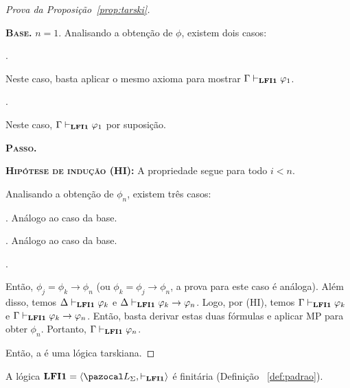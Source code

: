 \begin{proof}[Prova da Proposição~\ref{prop:tarski}]
\begin{adjustwidth}{1cm}{}
\begin{adjustwidth}{1cm}{}
                \textbf{\textsc{Base.}} $n = 1$.
                Analisando a obtenção de $\phi$, existem dois casos:
                \begin{provaporcasos}
                . 
                
                Neste caso, basta aplicar o mesmo axioma para mostrar $\Gamma \vdash_{{\normalfont\textbf{LFI1}}{}} \varphi_1$.
                
                \casodeprova{$\phi_1 \in \Delta$}. 
                
                Neste caso, $\Gamma \vdash_{{\normalfont\textbf{LFI1}}{}} \varphi_1$ por suposição.
            \end{provaporcasos}

            \noindent\textbf{\textsc{Passo.}} 
            
            \noindent \textbf{\textsc{Hipótese de indução (HI):}} A propriedade segue para todo $i < n$.

            Analisando a obtenção de $\phi_n$, existem três casos:
            \begin{provaporcasos}
                . Análogo ao caso da base.
                
                . Análogo ao caso da base.
                
                .
                
                Então, $\phi_j = \phi_k \to \phi_n$ (ou $\phi_k = \phi_j \to \phi_n$, a prova para este caso é análoga). Além disso, temos $\Delta \vdash_{{\normalfont\textbf{LFI1}}{}} \varphi_k$ e $\Delta \vdash_{{\normalfont\textbf{LFI1}}{}} \varphi_k \to \varphi_n$. Logo, por (HI), temos $\Gamma \vdash_{{\normalfont\textbf{LFI1}}{}} \varphi_k$ e $\Gamma \vdash_{{\normalfont\textbf{LFI1}}{}} \varphi_k \to \varphi_n$. Então, basta derivar estas duas fórmulas e aplicar MP para obter $\phi_n$. Portanto, $\Gamma \vdash_{{\normalfont\textbf{LFI1}}{}} \varphi_n$.
            \end{provaporcasos}
        \end{adjustwidth}
    \end{adjustwidth}

        Então, a \lfium{} é uma lógica tarskiana.
        
    \end{proof}

    
    \begin{proposicao}\label{prop:finit}        
        A lógica $\lfium{} = \langle \ling, \conhil \rangle$ é finitária (Definição ~\ref{def:padrao}).
    \end{proposicao}

